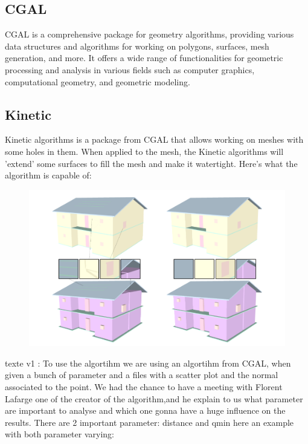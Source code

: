 \documentclass{article}
\begin{document}
\subsection{CGAL}
CGAL is a comprehensive package for geometry algorithms, providing various data structures and algorithms for working on polygons, surfaces, mesh generation, and more.
It offers a wide range of functionalities for geometric processing and analysis in various fields such as computer graphics, computational geometry, and geometric modeling.


\subsection{Kinetic}

Kinetic algorithms is a package from CGAL that allows working on meshes with some holes in them. When applied to the mesh, the Kinetic algorithms will 'extend' some surfaces to fill the mesh and make it watertight. 
Here's what the algorithm is capable of:

\begin{figure}[h]
    
\includegraphics[scale =   0.3 ]{../images/example_algorithm.png}



\end{figure}

texte v1 : 
To use the algortihm we are using an algortihm from CGAL, when given a bunch of parameter and a files with a scatter plot and the normal associated to the point.
We had the chance to have a meeting with Florent Lafarge one of the creator of the algorithm,and he explain to us what parameter are important to analyse 
and which one gonna have a huge influence on the results.
There are 2 important parameter: distance and qmin here an example with both parameter varying:
\end{document}
